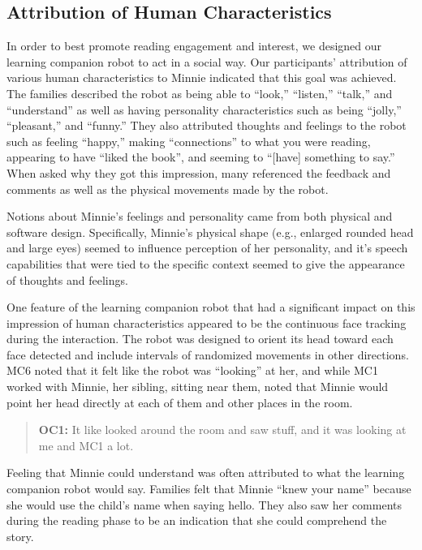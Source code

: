 \documentclass{sigchi}
\begin{document}
\subsection{Attribution of Human Characteristics}
In order to best promote reading engagement and interest, we designed our learning companion robot to act in a social way. Our participants' attribution of various human characteristics to Minnie indicated that this goal was achieved. The families described the robot as being able to ``look,'' ``listen,'' ``talk,'' and ``understand'' as well as having personality characteristics such as being ``jolly,'' ``pleasant,'' and ``funny.'' They also attributed thoughts and feelings to the robot such as feeling ``happy,'' making ``connections'' to what you were reading, appearing to have ``liked the book'', and seeming to ``[have] something to say.'' When asked why they got this impression, many referenced the feedback and comments as well as the physical movements made by the robot. 

Notions about Minnie's feelings and personality came from both physical and software design. Specifically, Minnie's physical shape (e.g., enlarged rounded head and large eyes) seemed to influence perception of her personality, and it's speech capabilities that were tied to the specific context seemed to give the appearance of thoughts and feelings. 

One feature of the learning companion robot that had a significant impact on this impression of human characteristics appeared to be the continuous face tracking during the interaction. The robot was designed to orient its head toward each face detected and include intervals of randomized movements in other directions. MC6 noted that it felt like the robot was ``looking'' at her, and while MC1 worked with Minnie, her sibling, sitting near them, noted that Minnie would point her head directly at each of them and other places in the room.


	 \begin{quote}
	 	 \textbf{OC1:} It like looked around the room and saw stuff, and it was looking at me and MC1 a lot.
	 \end{quote}
	
Feeling that Minnie could understand was often attributed to what the learning companion robot would say. Families felt that Minnie ``knew your name'' because she would use the child's name when saying hello. They also saw her comments during the reading phase to be an indication that she could comprehend the story.
\end{document}
